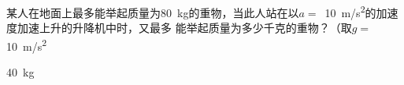 某人在地面上最多能举起质量为\qty{80}{kg}的重物，当此人站在以\(a =\) \,\qty{10}{m/s^2}的加速度加速上升的升降机中时，又最多	能举起质量为多少千克的重物？（取\(g =\) \,\qty{10}{m/s^2}
\begin{answer}
    \qty{40}{kg}
\end{answer}